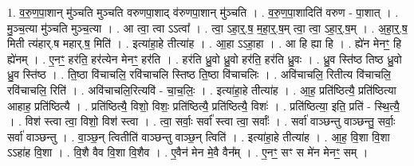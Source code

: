\documentclass[17pt]{extarticle}
\begin{document}
1. व॒रु॒ण॒पा॒शान् मु॑ञ्चति मुञ्चति वरुणपा॒शाद् व॑रुणपा॒शान् मु॑ञ्चति । . व॒रु॒ण॒पा॒शादिति॑ वरुण - पा॒शात् । . मु॒ञ्च॒त्या मु॑ञ्चति मुञ्च॒त्या । . आ त्वा॒ त्वा ऽऽत्वा᳚ । . त्वा॒ ऽहा॒र्॒.ष॒ म॒हा॒र्॒.ष॒म् त्वा॒ त्वा॒ ऽहा॒र्॒.ष॒म् । . अ॒हा॒र्॒.ष॒ मिती त्य॑हार्.ष महार्.ष॒ मिति॑ । . इत्या॑हा॒हे तीत्या॑ह । . आ॒हा ऽऽहा॒हा । . आ हि ह्या हि । . ह्ये॑न मेनꣳ॒॒ हि ह्ये॑नम् । . ए॒नꣳ॒॒ हर॑ति॒ हर॑त्येन मेनꣳ॒॒ हर॑ति । . हर॑ति ध्रु॒वो ध्रु॒वो हर॑ति॒ हर॑ति ध्रु॒वः । . ध्रु॒व स्ति॑ष्ठ तिष्ठ ध्रु॒वो ध्रु॒व स्ति॑ष्ठ । . ति॒ष्ठा वि॑चाचलि॒ रवि॑चाचलि स्तिष्ठ ति॒ष्ठा वि॑चाचलिः । . अवि॑चाचलि॒ रितीत्य वि॑चाचलि॒ रवि॑चाचलि॒ रिति॑ । . अवि॑चाचलि॒रित्यवि॑ - चा॒च॒लिः॒ । . इत्या॑हा॒हे तीत्या॑ह । . आ॒ह॒ प्रति॑ष्ठित्यै॒ प्रति॑ष्ठित्या आहाह॒ प्रति॑ष्ठित्यै । . प्रति॑ष्ठित्यै॒ विशो॒ विशः॒ प्रति॑ष्ठित्यै॒ प्रति॑ष्ठित्यै॒ विशः॑ । . प्रति॑ष्ठित्या॒ इति॒ प्रति॑ - स्थि॒त्यै॒ । . विश॑ स्त्वा त्वा॒ विशो॒ विश॑ स्त्वा । . त्वा॒ सर्वाः॒ सर्वा᳚ स्त्वा त्वा॒ सर्वाः᳚ । . सर्वा॑ वाञ्छन्तु वाञ्छन्तु॒ सर्वाः॒ सर्वा॑ वाञ्छन्तु । . वा॒ञ्छ॒न् त्वितीति॑ वाञ्छन्तु वाञ्छ॒न् त्विति॑ । . इत्या॑हा॒हे तीत्या॑ह । . आ॒ह॒ वि॒शा वि॒शा ऽऽहा॑ह वि॒शा । . वि॒शै वैव वि॒शा वि॒शैव । . ए॒वैन॑ मेन मे॒वै वैन᳚म् । . ए॒नꣳ॒॒ सꣳ स मे॑न मेनꣳ॒॒ सम् । \newline
\end{document}
